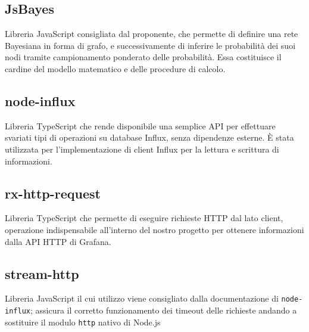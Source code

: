 \subsection{JsBayes}
Libreria JavaScript consigliata dal proponente, che permette di definire una rete Bayesiana in forma di grafo, e successivamente di inferire le probabilità dei suoi nodi tramite campionamento ponderato delle probabilità. Essa costituisce il cardine del modello matematico e delle procedure di calcolo.

\subsection{node-influx}
Libreria TypeScript che rende disponibile una semplice API per effettuare svariati tipi di operazioni su database Influx, senza dipendenze esterne. È stata utilizzata per l'implementazione di client Influx per la lettura e scrittura di informazioni.

\subsection{rx-http-request}
Libreria TypeScript che permette di eseguire richieste HTTP dal lato client, operazione indispensabile all'interno del nostro progetto per ottenere informazioni dalla API HTTP di Grafana. 

\subsection{stream-http}
Libreria JavaScript il cui utilizzo viene consigliato dalla documentazione di \texttt{node-influx}; assicura il corretto funzionamento dei timeout delle richieste andando a sostituire il modulo \texttt{http} nativo di Node.js